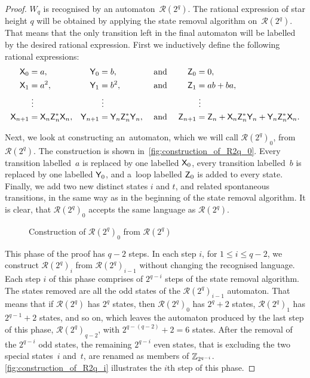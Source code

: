 \begin{proof}
    $W_q$ is recognised by an automaton~${\mathcal{R}(2^q)}$. The rational expression of star height $q$ will be obtained by applying the state removal algorithm on~${\mathcal{R}(2^q)}$. That means that the only transition left in the final automaton will be labelled by the desired rational expression. First we inductively define the following rational expressions:
    \begin{align*}
        {\mathsf{X}}_0 &= a, & {\mathsf{Y}}_0 &= b, & &\text{ and } & {\mathsf{Z}}_0 &= 0, \\
        {\mathsf{X}}_1 &= a^2, & {\mathsf{Y}}_1 &= b^2, & &\text{ and } & {\mathsf{Z}}_1 &= ab+ba, \\
        &\; \vdots & &\; \vdots & & & &\; \vdots \\
        {\mathsf{X}}_{n+1} &= {\mathsf{X}}_n {\mathsf{Z}}_n^* {\mathsf{X}}_n, & {\mathsf{Y}}_{n+1} &= {\mathsf{Y}}_n {\mathsf{Z}}_n^* {\mathsf{Y}}_n, & &\text{ and } & {\mathsf{Z}}_{n+1} &= {\mathsf{Z}}_n + {\mathsf{X}}_n {\mathsf{Z}}_n^* {\mathsf{Y}}_n + {\mathsf{Y}}_n {\mathsf{Z}}_n^* {\mathsf{X}}_n.
    \end{align*}

    Next, we look at constructing an~automaton, which we will call ${\mathcal{R}(2^q)}_0$, from ${\mathcal{R}(2^q)}$. The construction is shown in~\autoref*{fig:construction_of_R2q_0}. Every transition labelled~$a$ is replaced by one labelled ${\mathsf{X}}_0$, every transition labelled~$b$ is replaced by one labelled ${\mathsf{Y}}_0$, and a~loop labelled ${\mathsf{Z}}_0$ is added to every state. Finally, we add two new distinct states $i$ and $t$, and related spontaneous transitions, in the same way as in the beginning of the state removal algorithm. It is clear, that ${\mathcal{R}(2^q)}_0$ accepts the same language as ${\mathcal{R}(2^q)}$.

    \begin{figure}[h]%
        \centering
        \hspace{60pt}%
        \caption{Construction of ${\mathcal{R}(2^q)}_0$ from ${\mathcal{R}(2^q)}$}\label{fig:construction_of_R2q_0}%
    \end{figure}

    This phase of the proof has $q-2$ steps. In each step $i$, for $1 \leq i \leq q-2$, we construct ${\mathcal{R}(2^q)}_i$ from ${\mathcal{R}(2^q)}_{i-1}$ without changing the recognised language. Each step $i$ of this phase comprises of $2^{q-i}$ steps of the state removal algorithm. The states removed are all the odd states of the ${\mathcal{R}(2^q)}_{i-1}$ automaton. That means that if ${\mathcal{R}(2^q)}$ has $2^q$ states, then ${\mathcal{R}(2^q)}_0$ has $2^q + 2$ states, ${\mathcal{R}(2^q)}_1$ has $2^{q-1} + 2$ states, and so on, which leaves the automaton produced by the last step of this phase, ${\mathcal{R}(2^q)}_{q-2}$, with $2^{q-(q-2)} + 2 = 6$ states. After the removal of the $2^{q-i}$ odd states, the remaining $2^{q-i}$ even states, that is excluding the two special states~$i$ and~$t$, are renamed as members of $\mathbb{Z}_{2^{q-i}}$. \autoref*{fig:construction_of_R2q_i} illustrates the $i$th step of this phase.


\end{proof}

